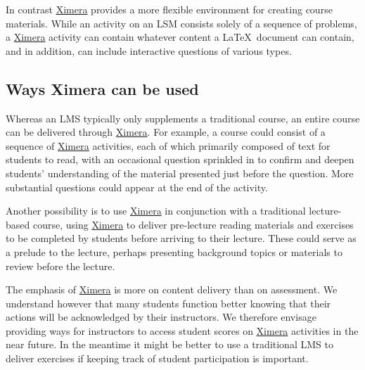 \documentclass{ximera}
\begin{document}
In contrast \href{http://ximera.osu.edu}{\sf Ximera} provides a more flexible environment for creating course materials.
While an activity on an LSM consists solely of a sequence of problems, a \href{http://ximera.osu.edu}{\sf Ximera}
activity can contain whatever content a \LaTeX\ document can contain, and in addition, can include interactive questions
of various types.

\subsection{Ways Ximera can be used}
Whereas an LMS typically only supplements a traditional course, an entire course can be delivered through
\href{http://ximera.osu.edu}{\sf Ximera}.
For example, a course could consist of a sequence of \href{http://ximera.osu.edu}{\sf Ximera} activities, each of which primarily composed of text for students to read, with an occasional question sprinkled in to confirm and deepen students'
understanding of the material presented just before the question.
More substantial questions could appear at the end of the activity.

Another possibility is to use \href{http://ximera.osu.edu}{\sf Ximera} in conjunction with a traditional lecture-based course,
using \href{http://ximera.osu.edu}{\sf Ximera} to deliver pre-lecture reading materials and exercises to be completed by students before arriving to their lecture.
These could serve as a prelude to the lecture, perhaps presenting background topics or materials
to review before the lecture.

The emphasis of \href{http://ximera.osu.edu}{\sf Ximera} is more on content delivery than on assessment.
We understand however that many students function better knowing that their actions will be acknowledged by their instructors. We therefore envisage providing ways for instructors to access student scores on \href{http://ximera.osu.edu}{\sf Ximera} activities in the near future. In the meantime it might be better to use a traditional LMS to deliver exercises
if keeping track of student participation is important.
\end{document}
